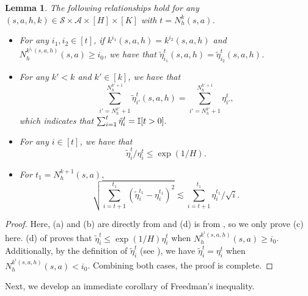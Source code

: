 \documentclass{article}
\newtheorem{lemma}{Lemma}[section]
\begin{document}
\begin{lemma}\label{property_tilde_eta}
		The following relationships hold for any $(s,a,h,k)\in \mathcal{S}\times \mathcal{A}\times [H]\times [K]$ with $t = N_h^{k}(s,a)$.
		\begin{itemize}
			\item[(a)] For any $i_1,i_2\in [t]$, if $k^{i_1}(s,a,h) = k^{i_2}(s,a,h)$ and $N_h^{k^{i_1}(s,a,h)}(s,a)\geq i_0$, we have that
			$\tilde{\eta}^t_{i_1}(s,a,h) = \tilde{\eta}^t_{i_2}(s,a,h)$.
			\item[(b)] For any $k'< k$ and $k' \in [k]$, we have that
			$$\sum_{i' = N_h^{k'}+1}^{N_h^{k'+1}} \tilde{\eta}^t_{i'}(s,a,h)=\sum_{i' = N_h^{k'}+1}^{N_h^{k'+1}} \eta^t_{i'},$$
			which indicates that
			$\sum_{i=1}^t \Tilde{\eta}^t_i = \mathbb{I}[t>0].$
			\item[(c)] For any $i\in [t]$,  we have that
			$$\tilde{\eta}^t_i/\eta^t_i\leq \exp(1/H).$$
            \item[(d)] For $t_1 = N_h^{k+1}(s,a),$  $$   \sqrt{\sum_{i = t+1}^{t_1}(\tilde{\eta}_i^{t_1}-\eta^{t_1}_i)^2}\lesssim \sum_{i = t+1}^{t_1} \eta^{t_1}_{i}/\sqrt{i}.$$ 
		\end{itemize}
	\end{lemma}
\begin{proof}
    Here, (a) and (b) are directly from \cite[Lemma B.3]{zheng2023federated} and (d) is from \cite[Equation (19)]{zheng2023federated}, so we only prove (c) here. (d) of \cite[Lemma B.3]{zheng2023federated} proves that 
$
\tilde{\eta}^t_i \leq \exp(1/H)\eta^t_i
$
when \( N_h^{k^{i}(s,a,h)}(s,a)\geq i_0 \). Additionally, by the definition of \( \tilde{\eta}^t_i \) (see ), we have \( \tilde{\eta}^t_i = \eta^t_i \) when \( N_h^{k^{i}(s,a,h)}(s,a)< i_0 \). Combining both cases, the proof is complete.
\end{proof}
    Next, we develop an immediate corollary of Freedman’s inequality.
\end{document}
